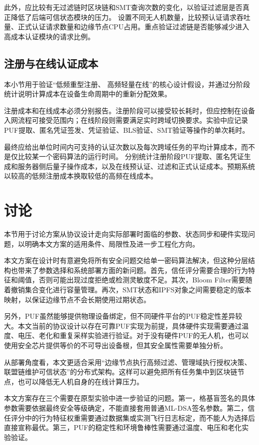 \documentclass[conference]{IEEEtran}
\begin{document}
	此外，应比较有无过滤链时区块链和SMT查询次数的变化，以验证过滤层是否真正降低了后端可信状态模块的压力。
	设置不同无人机数量，比较预认证请求吞吐量、正式认证请求数量和边缘节点CPU占用。重点验证过滤链是否能够减少进入高成本认证模块的请求比例。
	
	\subsection{注册与在线认证成本}
	
	本小节用于验证“低频重型注册、 高频轻量在线”的核心设计假设，并通过分阶段统计说明计算成本在设备生命周期中的重新分配效果。
	
	注册成本和在线成本必须分别报告。注册阶段可以接受较长耗时，但应控制在设备入网流程可接受范围内；在线阶段则需要满足实时跨域切换要求。实验中应记录PUF提取、匿名凭证签发、凭证验证、BLS验证、SMT验证等操作的单次耗时。
	
	最终应给出单位时间内可支持的认证次数以及每次跨域任务的平均计算成本，而不是仅比较某一个密码算法的运行时间。
	分别统计注册阶段PUF提取、匿名凭证生成和服务器侧后量子操作成本，以及在线预认证、过滤和正式认证成本。预期系统以较高的低频注册成本换取较低的高频在线成本。
	
	\section{讨论}
	
	本节用于讨论方案从协议设计走向实际部署时面临的参数、状态同步和硬件实现问题，以明确本文方案的适用条件、局限性及进一步工程化方向。
	
	本文方案在设计时有意避免将所有安全问题交给单一密码算法解决，但这种分层结构也带来了参数选择和系统部署方面的新问题。首先，信任评分需要合理的行为特征和阈值，否则可能出现过度拒绝或检测灵敏度不足。其次，Bloom Filter需要随着撤销集合变化进行容量管理。再次，SMT状态和IPFS对象之间需要稳定的版本映射，以保证边缘节点不会长期使用过期状态。
	
	另外，PUF虽然能够提供物理设备绑定，但不同硬件平台的PUF稳定性差异较大。本文当前的协议设计以存在可靠PUF实现为前提，具体硬件实现需要通过温度、电压、老化和重复采样实验进行验证。对于没有硬件PUF的无人机，也可以使用安全芯片提供等价的不可导出设备根，但其安全属性需要单独分析。
	
	从部署角度看，本文更适合采用“边缘节点执行高频过滤、管理域执行授权决策、联盟链维护可信状态”的分布式架构。这样可以避免把所有任务集中到区块链节点，也可以降低无人机自身的在线计算压力。
	
	本文方案存在三个需要在原型实验中进一步验证的问题。第一，格基盲签名的具体参数需要依据最终安全等级确定，不能直接套用普通ML-DSA签名参数。第二，信任评分中的行为特征权重需要通过数据集或实测飞行日志标定，而不能人为选择后直接宣称最优。第三，PUF的稳定性和环境鲁棒性需要通过温度、电压和老化实验验证。
	
\end{document}
